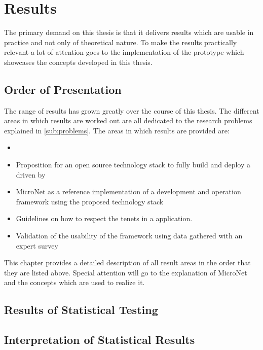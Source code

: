 \chapter{Results}

The primary demand on this thesis is that it delivers results which are
usable in practice and not only of theoretical nature. To make the results
practically relevant a lot of attention goes to the implementation of the
prototype which showcases the concepts developed in this thesis.

\section{Order of Presentation}

The range of results has grown greatly over the course of this thesis. The
different areas in which results are worked out are all dedicated to the
research problems explained in \autoref{sub:problems}. The areas in which
results are provided are:

\begin{itemize}
  \item \item Proposition for an  open source technology stack to fully build and
  deploy a \og{} driven by \mss{}
  \item MicroNet as a reference implementation of a \ms{} \og{} development and
  operation framework using the proposed technology stack
  \item Guidelines on how to respect the \ms{} tenets in a \og{} \ms{}
  application.
  \item Validation of the usability of the framework using data gathered with an
  expert survey 
\end{itemize}

This chapter provides a detailed description of all result areas in the order
that they are listed above. Special attention will go to the explanation of
MicroNet and the concepts which are used to realize it.

\newpage

\newpage

\newpage

\newpage



\section{Results of Statistical Testing}

\section{Interpretation of Statistical Results}